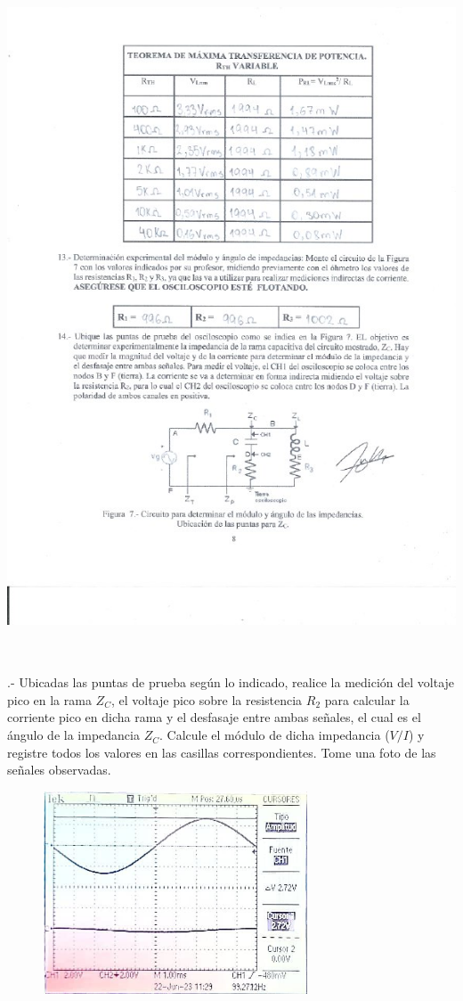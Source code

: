 \documentclass[12pt]{article}
\begin{document}
	\includegraphics[width=16cm,height=21cm]{Img/Resultados_6}\\
	
	.- Ubicadas las puntas de prueba según lo indicado, realice la medición del voltaje pico en la rama $Z_{C}$, el voltaje pico sobre la resistencia $R_{2}$ para calcular la corriente pico en dicha rama y el desfasaje entre ambas señales, el cual es el ángulo de la impedancia $Z_{C}$. Calcule el módulo de dicha impedancia ($V/I$) y registre todos los valores en las casillas correspondientes. Tome una foto de las señales observadas.
	
	\begin{center}
		\includegraphics[width=10cm,height=6cm]{Img/resul_15}\\
	\end{center}
	
\end{document}
